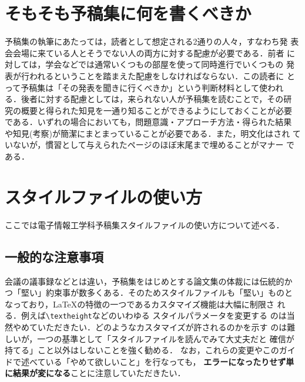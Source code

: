 \documentclass[a4j, 9pt, twocolumn, twoside]{jsarticle}
\newcommand{\Teacher}{大矢 健一}
\begin{document}
\twocolumn[\Maketitle]\footnotetext[1]{指導教員: \Teacher}
\section{そもそも予稿集に何を書くべきか}
予稿集の執筆にあたっては，読者として想定される2通りの人々，すなわち発
表会会場に来ている人とそうでない人の両方に対する配慮が必要である．前者
に対しては，学会などでは通常いくつもの部屋を使って同時進行でいくつもの
発表が行われるということを踏まえた配慮をしなければならない．この読者に
とって予稿集は「その発表を聞きに行くべきか」という判断材料として使われ
る．後者に対する配慮としては，来られない人が予稿集を読むことで，その研
究の概要と得られた知見を一通り知ることができるようにしておくことが必要
である．いずれの場合においても，問題意識・アプローチ方法・得られた結果
や知見(考察)が簡潔にまとまっていることが必要である．また，明文化はされ
ていないが，慣習として与えられたページのほぼ末尾まで埋めることがマナー
である．

\section{スタイルファイルの使い方}
ここでは電子情報工学科予稿集スタイルファイルの使い方について述べる．

\subsection{一般的な注意事項}
会議の議事録などとは違い，予稿集をはじめとする論文集の体裁には伝統的か
つ「堅い」約束事が数多くある．そのためスタイルファイルも「堅い」ものと
なっており，\LaTeX の特徴の一つであるカスタマイズ機能は大幅に制限さ
れる．例えば\texttt{\textbackslash textheight}などのいわゆる
スタイルパラメータを変更する
のは当然やめていただきたい．どのようなカスタマイズが許されるのかを示す
のは難しいが，一つの基準として「スタイルファイルを読んでみて大丈夫だと
確信が持てる」こと以外はしないことを強く勧める．
なお，これらの変更やこのガイドで述べている「やめて欲しいこと」を行なっても，
\textbf{エラーになったりせず単に結果が変になる}ことに注意していただきたい．
\end{document}
